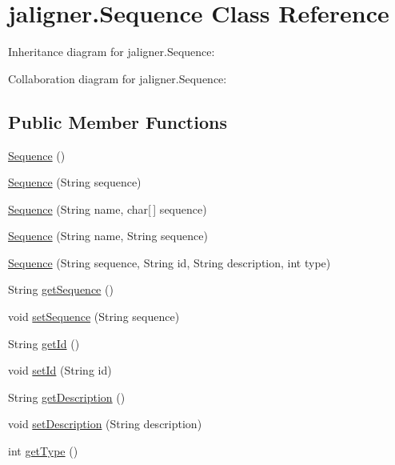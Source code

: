 \hypertarget{classjaligner_1_1_sequence}{\section{jaligner.\+Sequence Class Reference}
\label{classjaligner_1_1_sequence}
}


Inheritance diagram for jaligner.\+Sequence\+:


Collaboration diagram for jaligner.\+Sequence\+:
\subsection*{Public Member Functions}
\begin{DoxyCompactItemize}
\item 
\hyperlink{classjaligner_1_1_sequence_a5bb42ea5e75b4fec86bf027e34a1b327}{Sequence} ()
\item 
\hyperlink{classjaligner_1_1_sequence_aa0ab66e9ac304d89f4b236c847a78de3}{Sequence} (String sequence)
\item 
\hyperlink{classjaligner_1_1_sequence_affd6ac936d71cf2e452b72b87efb8d7c}{Sequence} (String name, char\mbox{[}$\,$\mbox{]} sequence)
\item 
\hyperlink{classjaligner_1_1_sequence_a07bbb31a779dbebbc366f063bcd8354f}{Sequence} (String name, String sequence)
\item 
\hyperlink{classjaligner_1_1_sequence_aedf2ffb87580919ac6e9ced56e05e906}{Sequence} (String sequence, String id, String description, int type)
\item 
String \hyperlink{classjaligner_1_1_sequence_a8f74fb0c13f60b0c80780bdb07792a48}{get\+Sequence} ()
\item 
void \hyperlink{classjaligner_1_1_sequence_aff2a4b49f5ad221d49972ff94eb54858}{set\+Sequence} (String sequence)
\item 
String \hyperlink{classjaligner_1_1_sequence_a1ce3b0e34788f6f27dc7312f12fa8191}{get\+Id} ()
\item 
void \hyperlink{classjaligner_1_1_sequence_a7a62cfa9181a4602171226b22db21c88}{set\+Id} (String id)
\item 
String \hyperlink{classjaligner_1_1_sequence_a02a715ccb253a4d7af4dd6f40c16b6e5}{get\+Description} ()
\item 
void \hyperlink{classjaligner_1_1_sequence_afe611456a9666b36489172cad9efa137}{set\+Description} (String description)
\item 
int \hyperlink{classjaligner_1_1_sequence_a4833766cfd049625955716ddc9aba95e}{get\+Type} ()

\end{DoxyCompactItemize}
